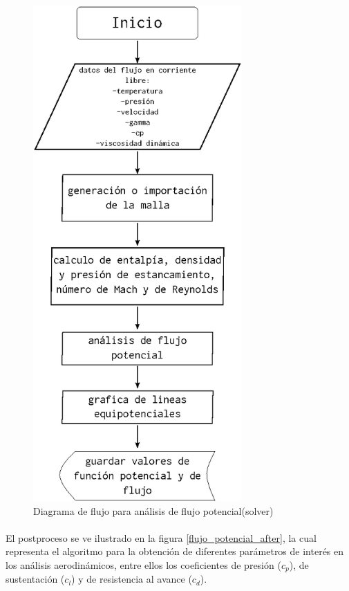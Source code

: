 \documentclass[letterpaper, openright, 12pt]{book}
\begin{document}
    \begin{figure}[htbp!]
        \centering
        \includegraphics[keepaspectratio, width=80mm]{./Imagenes/flujo_potencial}
        \caption{Diagrama de flujo para análisis de flujo potencial(solver)}
        \label{flujo_potencial}
    \end{figure}

    \paragraph*{}
        El postproceso se ve ilustrado en la figura \ref{flujo_potencial_after},
        la cual representa el algoritmo para la obtención de diferentes
        parámetros de interés en los análisis aerodinámicos, entre ellos los
        coeficientes de presión ($c_p$), de sustentación ($c_l$) y de
        resistencia al avance ($c_d$).
\end{document}
